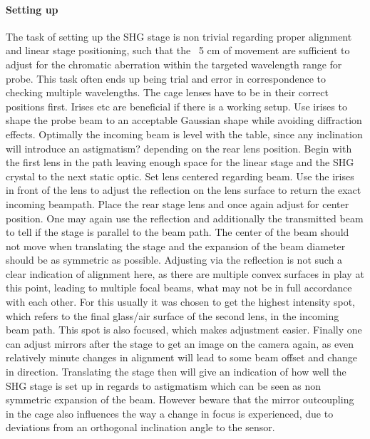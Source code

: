 \documentclass[10pt,a4paper]{article}
\begin{document}
\paragraph{Setting up}
The task of setting up the SHG stage is non trivial regarding proper alignment and linear stage positioning, such that the ~5 cm of movement are sufficient to adjust for the chromatic aberration within the targeted wavelength range for probe. This task often ends up being trial and error in correspondence to checking multiple wavelengths. The cage lenses have to be in their correct positions first.\newline
Irises etc are beneficial if there is a working setup.\newline
Use irises to shape the probe beam to an acceptable Gaussian shape while avoiding diffraction effects. Optimally the incoming beam is level with the table, since any inclination will introduce an astigmatism? depending on the rear lens position.\newline
Begin with the first lens in the path leaving enough space for the linear stage and the SHG crystal to the next static optic. Set lens centered regarding beam. Use the irises in front of the lens to adjust the reflection on the lens surface to return the exact incoming beampath.\newline
Place the rear stage lens and once again adjust for center position. One may again use the reflection and additionally the transmitted beam to tell if the stage is parallel to the beam path. The center of the beam should not move when translating the stage and the expansion of the beam diameter should be as symmetric as possible. Adjusting via the reflection is not such a clear indication of alignment here, as there are multiple convex surfaces in play at this point, leading to multiple focal beams, what may not be in full accordance with each other. For this usually it was chosen to get the highest intensity spot, which refers to the final glass/air surface of the second lens, in the incoming beam path. This spot is also focused, which makes adjustment easier.\newline
Finally one can adjust mirrors after the stage to get an image on the camera again, as even relatively minute changes in alignment will lead to some beam offset and change in direction. Translating the stage then will give an indication of how well the SHG stage is set up in regards to astigmatism which can be seen as non symmetric expansion of the beam. However beware that the mirror outcoupling in the cage also influences the way a change in focus is experienced, due to deviations from an orthogonal inclination angle to the sensor.
\end{document}

